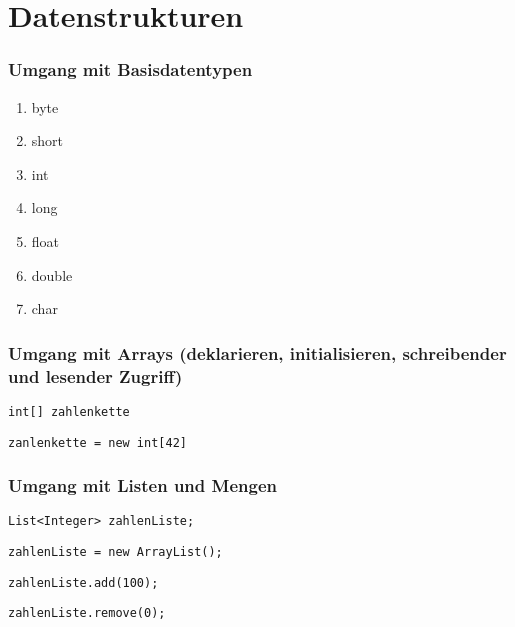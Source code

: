 \documentclass[mathserif]{beamer}
\begin{document}
\begin{frame}
\end{frame}

\section{Datenstrukturen}

\begin{frame}[fragile]
\frametitle{Umgang mit Basisdatentypen}
    \begin{enumerate}
        \item byte
        \item short
        \item int
        \item long
        \pause
        \item float
        \item double
        \pause
        \item char
    \end{enumerate}
\end{frame}

\begin{frame}[fragile]
\frametitle{Umgang mit Arrays (deklarieren, initialisieren, schreibender und lesender Zugriff)}
\pause
    \begin{lstlisting}
int[] zahlenkette
    \end{lstlisting}
\pause
    \begin{lstlisting}
zanlenkette = new int[42]
    \end{lstlisting}
\end{frame}

\begin{frame}[fragile]
\frametitle{Umgang mit Listen und Mengen}
\pause
    \begin{lstlisting}
List<Integer> zahlenListe;
    \end{lstlisting}
\pause
    \begin{lstlisting}
zahlenListe = new ArrayList();
    \end{lstlisting}
\pause
    \begin{lstlisting}
zahlenListe.add(100);
    \end{lstlisting}
\pause
    \begin{lstlisting}
zahlenListe.remove(0);
    \end{lstlisting}
\end{frame}
\end{document}
